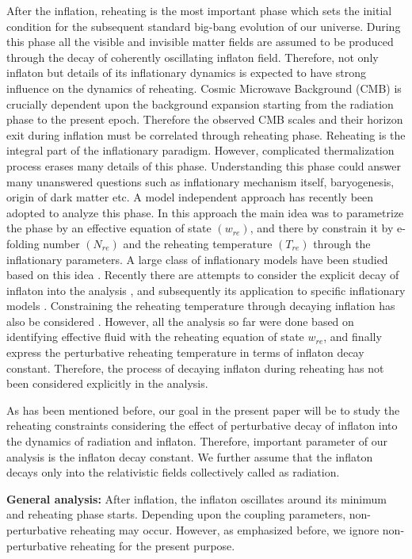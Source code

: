 \documentclass[prl,twocolumn,superscriptaddress,doublespace]{revtex4}%
\begin{document}
 After the inflation, reheating is the most important phase which sets the initial condition for
 the subsequent standard big-bang evolution of our universe. 
  During this phase all the visible and invisible matter fields are assumed to be produced through the decay of coherently oscillating inflaton field. Therefore, not only inflaton \cite{encyclopedia} but details of its inflationary dynamics is expected to have strong influence on the dynamics of reheating. 
Cosmic Microwave Background (CMB) is crucially dependent upon the background expansion starting from the radiation phase to the present epoch.
Therefore the observed CMB scales and their horizon exit during inflation must be correlated through reheating phase. Reheating\cite{reheating} is the integral part of the inflationary paradigm. However, complicated thermalization process erases many details of this phase. Understanding this phase could answer many unanswered questions 
such as inflationary mechanism itself, baryogenesis, origin of dark matter etc.
A model independent approach has recently been adopted \cite{martin} to
analyze this phase. In this approach the main idea was to parametrize the phase by an effective equation of state $(w_{re})$, and there by constrain it by e-folding number $(N_{re})$ and the reheating temperature $(T_{re})$ through the inflationary parameters. A large class of inflationary models have been studied based on this idea  \cite{martin,reheatingfollows}. Recently there are attempts to consider the explicit decay of inflaton into the analysis \cite{decay}, and subsequently its application to specific inflationary models \cite{decayfollows}. Constraining the reheating temperature through decaying inflation has also be considered \cite{reheatingtemp}. 
However, all the analysis  so far were done based on identifying effective fluid with the reheating equation of state $w_{re}$, and finally express the perturbative reheating temperature in terms of inflaton decay constant. Therefore, the process of decaying inflaton during reheating has not been considered explicitly in the analysis.   
 
As has been mentioned before, our goal in the present paper will be to study the reheating constraints considering the effect of perturbative decay of inflaton into the dynamics of radiation and inflaton. 
Therefore, important parameter of our analysis is the inflaton decay constant. We further assume that the inflaton decays only into the relativistic fields collectively called as radiation.

\textbf {General analysis:}
After inflation, the inflaton oscillates around its minimum and reheating phase starts. Depending upon the coupling parameters, non-perturbative reheating may occur. However, as emphasized before, we ignore non-perturbative reheating for the present purpose. 
\end{document}
